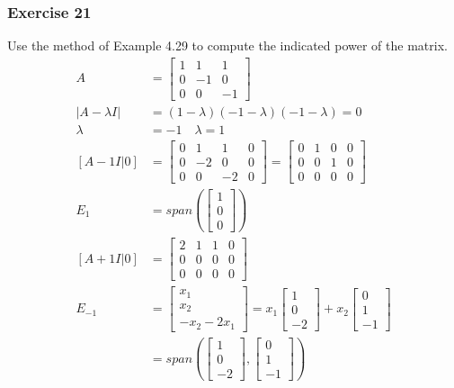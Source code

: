 \documentclass{math}
\begin{document}
\subsubsection*{Exercise 21}
Use the method of Example 4.29 to compute the indicated power of the matrix.
\begin{align*}
  A &= \begin{bmatrix}
    1 & 1 & 1 \\
    0 & -1 & 0 \\
    0 & 0 & -1
  \end{bmatrix} \\
  |A-\lambda I| &= (1-\lambda)(-1-\lambda)(-1-\lambda) = 0 \\
  \lambda &= -1 \quad \lambda = 1 \\
  [A-1I|0] &= \begin{bmatrix}
    0 & 1 & 1 & 0 \\
    0 & -2 & 0 & 0 \\
    0 & 0 & -2 & 0
  \end{bmatrix} = \begin{bmatrix}
    0 & 1 & 0 & 0 \\
    0 & 0 & 1 & 0 \\
    0 & 0 & 0 & 0
  \end{bmatrix} \\
  E_1 &= span\left(\begin{bmatrix}1 \\ 0 \\ 0\end{bmatrix}\right) \\
  [A+1I|0] &= \begin{bmatrix}
    2 & 1 & 1 & 0 \\
    0 & 0 & 0 & 0 \\
    0 & 0 & 0 & 0
  \end{bmatrix} \\
  E_{-1} &= \begin{bmatrix}x_1 \\ x_2 \\ -x_2-2x_1\end{bmatrix} =
    x_1\begin{bmatrix}1 \\ 0 \\ -2\end{bmatrix}+
    x_2\begin{bmatrix}0 \\ 1 \\ -1\end{bmatrix} \\
  &= span\left(\begin{bmatrix}1 \\ 0 \\ -2\end{bmatrix},
    \begin{bmatrix}0 \\ 1 \\ -1\end{bmatrix}\right)
\end{align*}
\end{document}
